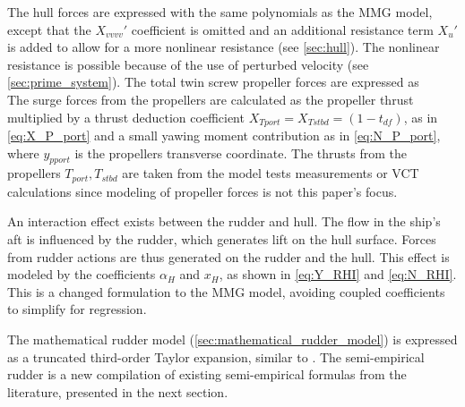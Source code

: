 The hull forces are expressed with the same polynomials as the MMG model, except that the ${X_{vvvv}}'$ coefficient is omitted and an additional resistance term ${X_u}'$ is added to allow for a more nonlinear resistance (see \autoref{sec:hull}). The nonlinear resistance is possible because of the use of perturbed velocity (see \autoref{sec:prime_system}).
The total twin screw propeller forces are expressed as
\begin{equation}
    \label{eq:X_P}
    
\end{equation}
%
\begin{equation}
    \label{eq:Y_P}
    
\end{equation}
%
\begin{equation}
    \label{eq:N_P}
    
\end{equation}
The surge forces from the propellers are calculated as the propeller thrust multiplied by a thrust deduction coefficient $X_{Tport}=X_{Tstbd}=(1-t_{df})$, as in \autoref{eq:X_P_port} and a small yawing moment contribution as in \autoref{eq:N_P_port}, where $y_{pport}$ is the propellers transverse coordinate. The thrusts from the propellers $T_{port}, T_{stbd}$ are taken from the model tests measurements or VCT calculations since modeling of propeller forces is not this paper's focus.
\begin{equation}
    \label{eq:X_P_port}
    
\end{equation}
\begin{equation}
    \label{eq:N_P_port}
    
\end{equation}

An interaction effect exists between the rudder and hull. The flow in the ship's aft is influenced by the rudder, which generates lift on the hull surface. Forces from rudder actions are thus generated on the rudder and the hull. This effect is modeled by the coefficients $\alpha_H$ and $x_H$, as shown in \autoref{eq:Y_RHI} and \autoref{eq:N_RHI}. This is a changed formulation to the MMG model, avoiding coupled coefficients to simplify for regression.
\begin{equation}
    \label{eq:Y_RHI}
    
\end{equation}
%
\begin{equation}
    \label{eq:N_RHI}
    
\end{equation}

The mathematical rudder model (\autoref{sec:mathematical_rudder_model}) is expressed as a truncated third-order Taylor expansion, similar to \citet{abkowitz_ship_1964}. 
The semi-empirical rudder is a new compilation of existing semi-empirical formulas from the literature, presented in the next section.
